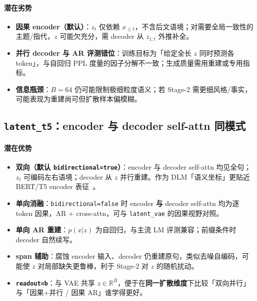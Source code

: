 \documentclass[UTF8,a4paper,11pt]{ctexart}
\begin{document}
\paragraph{潜在劣势}
\begin{itemize}
  \item \textbf{因果 encoder（默认）}：$z_t$ 仅依赖 $x_{\le t}$，不含后文语境；对需要全局一致性的主题/指代，$z$ 可能欠充分，需 decoder 从 $z_{1:t}$ 外推补全。
  \item \textbf{并行 decoder 与 AR 评测错位}：训练目标为「给定全长 $z$ 同时预测各 token」，与自回归 PPL 度量的因子分解不一致；生成质量需用重建或专用指标。
  \item \textbf{信息瓶颈}：$B{=}64$ 仍可能限制极细粒度语义；若 Stage-2 需更细风格/事实，可能表现为重建尚可但扩散样本偏模糊。
\end{itemize}

\subsection{\texttt{latent\_t5}：encoder 与 decoder self-attn 同模式}

\paragraph{潜在优势}
\begin{itemize}
  \item \textbf{双向（默认 \texttt{bidirectional=true}）}：encoder 与 decoder self-attn 均见全句；$z_t$ 可编码左右语境；decoder 从 $z$ 并行重建。作为 DLM「语义坐标」更贴近 BERT/T5 encoder 表征~\cite{devlin2019bert,raffel2020t5}。
  \item \textbf{单向消融}：\texttt{bidirectional=false} 时 encoder \textbf{与} decoder self-attn 均为逐 token 因果，AR + cross-attn，可与 \texttt{latent\_vae} 的因果视野对照。
  \item \textbf{单向 AR 重建}：$p(x|z)$ 为自回归，与主流 LM 评测兼容；前缀条件时 decoder 自然续写。
  \item \textbf{span 辅助}：腐蚀 encoder 输入、decoder 仍重建原句，类似去噪自编码，可能使 $z$ 对局部缺失更鲁棒，利于 Stage-2 对 $z$ 的随机扰动。
  \item \textbf{\texttt{readout=b}}：与 VAE 共享 $z\in\mathbb{R}^B$，便于在\textbf{同一扩散维度}下比较「双向并行」与「因果+并行 / 因果 AR」谁学得更好。
\end{itemize}
\end{document}
